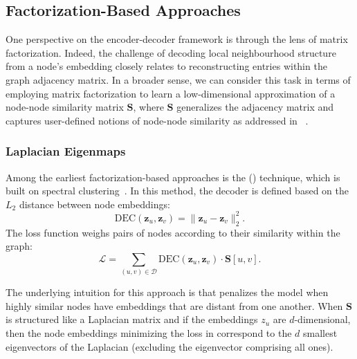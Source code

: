 \subsection{Factorization-Based Approaches}\label{sec:factorization}
One perspective on the encoder-decoder framework is through the lens of matrix factorization. Indeed, the challenge of decoding local neighbourhood structure from a node's embedding closely relates to reconstructing entries within the graph adjacency matrix. In a broader sense, we can consider this task in terms of employing matrix factorization to learn a low-dimensional approximation of a node-node similarity matrix $ \mathbf{S} $, where $ \mathbf{S} $ generalizes the adjacency matrix and captures user-defined notions of node-node similarity as addressed in ~\cite{Belkin2001laplacianEigenmapsSpectralClusteringTechniquesEmbeddingClustering}\cite{Kruskal1964MultidimensionalScalingOptimizingGoodnessFitNonmetricHypothesis}.

\subsubsection{Laplacian Eigenmaps}
Among the earliest factorization-based approaches is the  () technique, which is built on spectral clustering~\cite{Belkin2001laplacianEigenmapsSpectralClusteringTechniquesEmbeddingClustering}. In this method, the decoder is defined based on the $ L_2 $ distance between node embeddings:
\begin{equation*}
    \text{DEC}(\mathbf{z}_u, \mathbf{z}_v) = \|\mathbf{z}_u - \mathbf{z}_v\|_2^2.
\end{equation*}
The loss function weighs pairs of nodes according to their similarity within the graph:
\begin{equation}\label{eq:laplacianEigenmaploss}
    \mathcal{L} = \sum_{(u,v)\in\mathcal{D}} \text{DEC}(\mathbf{z}_u, \mathbf{z}_v) \cdot \textbf{S}[u,v].
\end{equation}

The underlying intuition for this approach is that  penalizes the model when highly similar nodes have embeddings that are distant from one another. When $ \mathbf{S} $ is structured like a Laplacian matrix and if the embeddings $ z_u $ are $ d $-dimensional, then the node embeddings minimizing the loss in  correspond to the $ d $ smallest eigenvectors of the Laplacian (excluding the eigenvector comprising all ones).

